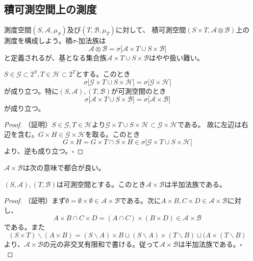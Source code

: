 \documentclass[../root.tex]{subfiles}
\begin{document}
\subsection{積可測空間上の測度}
測度空間$ ( S, \mathscr{A}, \mu_{S} ) $及び$ ( T, \mathscr{B}, \mu_{T} ) $に対して、
積可測空間$ ( S\times T, \mathscr{A}\otimes\mathscr{B} ) $上の測度を構成しよう。積$ \sigma $-加法族は
\[ \mathscr{A}\otimes\mathscr{B}=\sigma\lbrack \mathscr{A}\times T\cup S\times\mathscr{B} \rbrack \]
と定義されるが、基となる集合族$ \mathscr{A}\times T\cup S\times\mathscr{B} $はやや扱い難い。

\begin{Prop}{}{}
$ S\in\mathscr{G}\subset 2^{S}, T\in\mathscr{H}\subset 2^{T} $とする。このとき
\[ \sigma\lbrack \mathscr{G}\times T\cup S\times\mathscr{H} \rbrack = \sigma\lbrack \mathscr{G}\times\mathscr{H} \rbrack \]
が成り立つ。特に$ ( S, \mathscr{A} ), ( T, \mathscr{B} ) $が可測空間のとき
\[ \sigma\lbrack \mathscr{A}\times T\cup S\times\mathscr{B} \rbrack = \sigma\lbrack \mathscr{A}\times\mathscr{B} \rbrack \]
が成り立つ。
\end{Prop}

\begin{proof}
（証明）$ S\in\mathscr{G}, T\in\mathscr{H} $より$ \mathscr{G}\times T\cup S\times\mathscr{H} \subset \mathscr{G}\times\mathscr{H} $である。
故に左辺は右辺を含む。$ G\times H\in\mathscr{G}\times\mathscr{H} $を取る。このとき
\[ G\times H=G\times T\cap S\times H\in\sigma\lbrack \mathscr{G}\times T\cup S\times\mathscr{H} \rbrack \]
より、逆も成り立つ。$ \square $
\end{proof}

$ \mathscr{A}\times\mathscr{B} $は次の意味で都合が良い。

\begin{Prop}{}{}
$ ( S, \mathscr{A} ), ( T, \mathscr{B} ) $は可測空間とする。このとき$ \mathscr{A}\times\mathscr{B} $は半加法族である。
\end{Prop}

\begin{proof}
（証明）まず$ \emptyset=\emptyset\times\emptyset\in\mathscr{A}\times\mathscr{B} $である。次に$ A\times B, C\times D\in\mathscr{A}\times\mathscr{B} $に対し、
\[ A\times B\cap C\times D=( A\cap C )\times( B\times D )\in\mathscr{A}\times\mathscr{B} \]
である。また
\[ ( S\times T )\backslash( A\times B )=( S\backslash A )\times B\sqcup( S\backslash A )\times( T\backslash B )\sqcup( A\times( T\backslash B ) \]
より、$ \mathscr{A}\times\mathscr{B} $の元の非交叉有限和で書ける。従って$ \mathscr{A}\times\mathscr{B} $は半加法族である。$ \square $
\end{proof}
\end{document}

